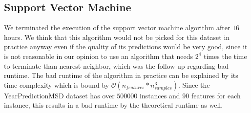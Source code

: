 \subsection{Support Vector Machine}\label{ds2:svm}
We terminated the execution of the support vector machine algorithm after $16$ hours. We think that this algorithm would not be picked for this dataset in practice anyway even if the quality of its predictions would be very good, since it is not reasonable in our opinion to use an algorithm that needs $2^4$ times the time to terminate than nearest neighbor, which was the follow up regarding bad runtime.
The bad runtime of the algorithm in practice can be explained by its time complexity which is bound by $\mathcal{O}(n_{features}*n_{samples}^3)$. Since the YearPredictionMSD dataset has over $500000$ instances and $90$ features for each instance, this results in a bad runtime by the theoretical runtime as well.
